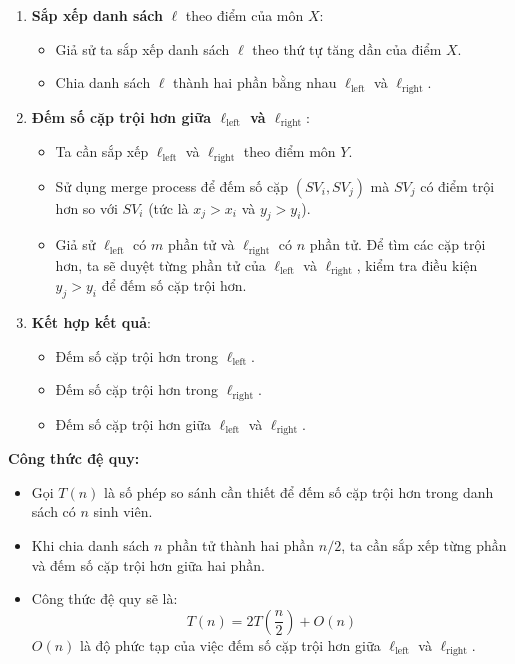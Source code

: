 \documentclass[12pt,a4paper]{article}
\begin{document}
\begin{enumerate}
    \item \textbf{Sắp xếp danh sách} \( \ell \) theo điểm của môn \( X \):
    \begin{itemize}
        \item Giả sử ta sắp xếp danh sách \( \ell \) theo thứ tự tăng dần của điểm \( X \).
        \item Chia danh sách \( \ell \) thành hai phần bằng nhau \( \ell_{\text{left}} \) và \( \ell_{\text{right}} \).
    \end{itemize}
    \item \textbf{Đếm số cặp trội hơn giữa \( \ell_{\text{left}} \) và \( \ell_{\text{right}} \)}:
    \begin{itemize}
        \item Ta cần sắp xếp \( \ell_{\text{left}} \) và \( \ell_{\text{right}} \) theo điểm môn \( Y \).
        \item Sử dụng merge process để đếm số cặp \((SV_i, SV_j)\) mà \( SV_j \) có điểm trội hơn so với \( SV_i \) (tức là \( x_j > x_i \) và \( y_j > y_i \)).
        \item Giả sử \( \ell_{\text{left}} \) có \( m \) phần tử và \( \ell_{\text{right}} \) có \( n \) phần tử. Để tìm các cặp trội hơn, ta sẽ duyệt từng phần tử của \( \ell_{\text{left}} \) và \( \ell_{\text{right}} \), kiểm tra điều kiện \( y_j > y_i \) để đếm số cặp trội hơn.
    \end{itemize}
    \item \textbf{Kết hợp kết quả}:
    \begin{itemize}
        \item Đếm số cặp trội hơn trong \( \ell_{\text{left}} \).
        \item Đếm số cặp trội hơn trong \( \ell_{\text{right}} \).
        \item Đếm số cặp trội hơn giữa \( \ell_{\text{left}} \) và \( \ell_{\text{right}} \).
    \end{itemize}
\end{enumerate}

\textbf{Công thức đệ quy:}

\begin{itemize}
    \item Gọi \( T(n) \) là số phép so sánh cần thiết để đếm số cặp trội hơn trong danh sách có \( n \) sinh viên.
    \item Khi chia danh sách \( n \) phần tử thành hai phần \( n/2 \), ta cần sắp xếp từng phần và đếm số cặp trội hơn giữa hai phần.
    \item Công thức đệ quy sẽ là:
    \[
    T(n) = 2T\left(\frac{n}{2}\right) + O(n)
    \]
    \( O(n) \) là độ phức tạp của việc đếm số cặp trội hơn giữa \( \ell_{\text{left}} \) và \( \ell_{\text{right}} \).
\end{itemize}
\end{document}
